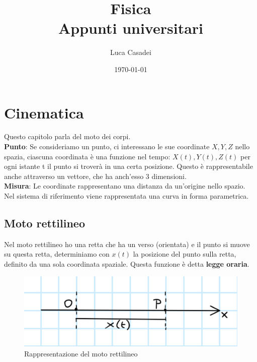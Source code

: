 \documentclass[a4paper,12pt]{report}
\title{\textbf{Fisica}\\Appunti universitari}
\author{Luca Casadei}
\date{\today}
\begin{document}
	\maketitle
	\tableofcontents
	\chapter{Cinematica}
	Questo capitolo parla del moto dei corpi.\\
	\textbf{Punto}: Se consideriamo un punto, ci interessano le sue coordinate ${X,Y,Z}$ nello spazia, ciascuna coordinata è una funzione nel tempo:
	${X(t),Y(t),Z(t)}$ per ogni istante t il punto si troverà in una certa posizione. Questo è rappresentabile anche attraverso un vettore, che ha anch'esso 3 dimensioni.\\
	\textbf{Misura}: Le coordinate rappresentano una distanza da un'origine nello spazio.
	Nel sistema di riferimento viene rappresentata una curva in forma parametrica.
	\section{Moto rettilineo}
	Nel moto rettilineo ho una retta che ha un verso (orientata) e il punto si muove su questa retta, determiniamo con ${x(t)}$ la posizione del punto sulla retta, definito da una sola coordinata spaziale. Questa funzione è detta \textbf{legge oraria}.
	\begin{figure}[H]
		\centering
		\includegraphics{./immagini/cinematica/figcine1.png}
		\caption{Rappresentazione del moto rettilineo}
	\end{figure}
\end{document}
